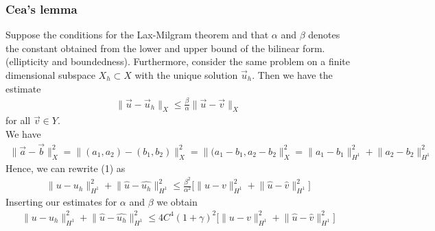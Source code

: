 \documentclass[11pt, norsk, a4paper]{article}
\newcommand\norm[1]{\lVert#1\rVert}
\begin{document}
\subsubsection*{Cea's lemma} 
Suppose the conditions for the Lax-Milgram theorem and that $\alpha$ and $\beta$ denotes the constant obtained from the lower and upper bound of the bilinear form. (ellipticity and boundedness). Furthermore, consider the same problem on a finite dimensional subspace $X_h \subset X$ with the unique solution $\vec{u}_h$. Then we have the estimate 
\begin{align}
    \norm{\vec{u}-\vec{u}_h}_X \leq \frac{\beta}{\alpha}\norm{\vec{u}-\vec{v}}_X
\end{align}
for all $\vec{v} \in Y$. \\
We have 
\begin{align*}
    \norm{\vec{a}-\vec{b}}^2_X = \norm{(a_1, a_2) - (b_1, b_2)}^2_X = \norm{(a_1-b_1, a_2-b_2}^2_X = \norm{a_1-b_1}_{H^1}^2+\norm{a_2-b_2}^2_{H^1}
\end{align*}
Hence, we can rewrite (1) as 
\begin{align*}
    \norm{u-u_h}^2_{H^1}+\norm{\hat{u}-\hat{u_h}}^2_{H^1} \leq \frac{\beta^2}{\alpha^2}\bigr[ \norm{u-v}^2_{H^1}+\norm{\hat{u}-\hat{v}}^2_{H^1}\bigr] 
\end{align*}
Inserting our estimates for $\alpha$ and $\beta$ we obtain 
\begin{align}
    \norm{u-u_h}^2_{H^1}+\norm{\hat{u}-\hat{u_h}}^2_{H^1} \leq 4C^4(1+\gamma)^2\bigr[ \norm{u-v}^2_{H^1}+\norm{\hat{u}-\hat{v}}^2_{H^1}\bigr] 
\end{align}
\end{document}
